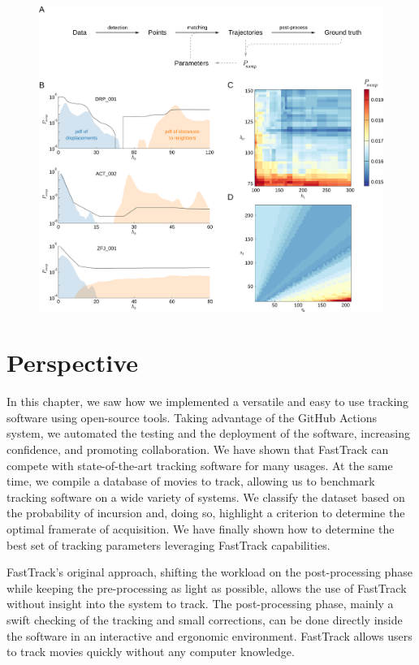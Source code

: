     \begin{figure}[h!]
    \centering
    \includegraphics[width=1\textwidth]{part_1/assets/Figure_4.png}
    \caption{\textbf{}}
    \label{part_1:fig_4}
    \end{figure}
	
\chapter{Perspective}

    In this chapter, we saw how we implemented a versatile and easy to use tracking software using open-source tools. Taking advantage of the GitHub Actions system, we automated the testing and the deployment of the software, increasing confidence, and promoting collaboration. We have shown that FastTrack can compete with state-of-the-art tracking software for many usages. At the same time, we compile a database of movies to track, allowing us to benchmark tracking software on a wide variety of systems. We classify the dataset based on the probability of incursion and, doing so, highlight a criterion to determine the optimal framerate of acquisition. We have finally shown how to determine the best set of tracking parameters leveraging FastTrack capabilities.

    FastTrack's original approach, shifting the workload on the post-processing phase while keeping the pre-processing as light as possible, allows the use of FastTrack without insight into the system to track. The post-processing phase, mainly a swift checking of the tracking and small corrections, can be done directly inside the software in an interactive and ergonomic environment. FastTrack allows users to track movies quickly without any computer knowledge.

